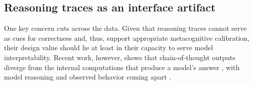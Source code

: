 \documentclass[acmlarge,review=true, anonymous=true]{acmart}
\begin{document}





\subsection{Reasoning traces as an interface artifact}
One key concern cuts across the data. Given that reasoning traces cannot serve as cues for correctness and, thus, support appropriate metacognitive calibration, their design value should lie at least in their capacity to serve model interpretability. Recent work, however, shows that chain-of-thought outputs diverge from the internal computations that produce a model's answer \cite{}, with model reasoning and observed behavior coming apart \cite{}. %
\end{document}

